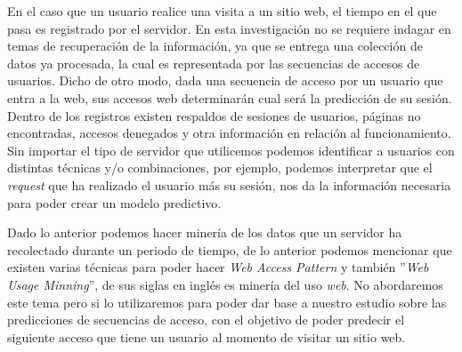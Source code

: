 
En el caso  que un usuario realice una visita a un sitio web, el tiempo en el que pasa es registrado por el servidor. En esta investigación no se requiere indagar en temas de recuperación de la información, ya que se entrega una colección de datos ya procesada, la cual es representada por las secuencias de accesos de usuarios. 
Dicho de otro modo, dada una secuencia de acceso por un usuario que entra a la web, sus accesos web determinarán cual será la predicción de su sesión. Dentro de los registros existen respaldos de sesiones de usuarios, páginas no encontradas, accesos denegados y otra información en relación al funcionamiento. Sin importar el tipo de servidor que utilicemos podemos identificar a usuarios con distintas técnicas y/o combinaciones, por ejemplo, podemos interpretar que el \emph{request} que ha realizado el usuario más su sesión, nos da la información necesaria para poder crear un modelo predictivo. 

Dado lo anterior podemos hacer minería de los datos que un servidor ha recolectado durante un periodo de tiempo, de lo anterior  podemos mencionar que existen varias técnicas para poder hacer \emph{Web Access Pattern } y también ''\emph{Web Usage Minning}'', de sus siglas en inglés es minería del uso \emph{web}. No abordaremos este tema pero si lo utilizaremos para poder dar base a nuestro estudio sobre las predicciones de secuencias de acceso, con el objetivo de poder predecir el siguiente acceso que tiene un usuario al momento de visitar un sitio web.








